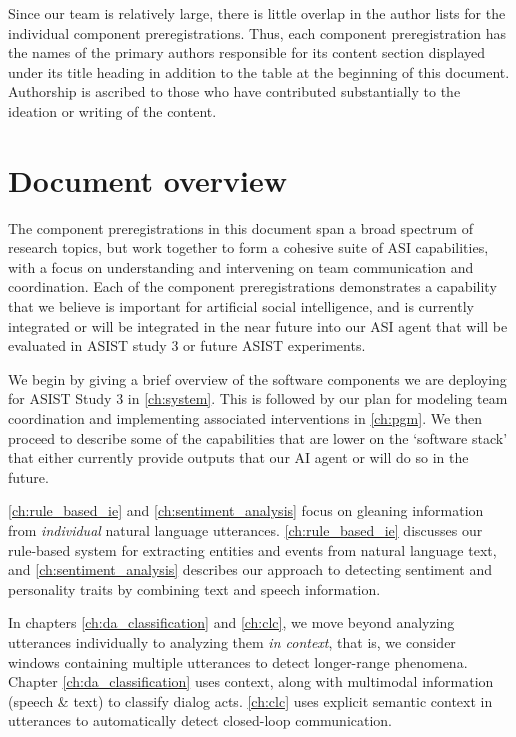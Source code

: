 Since our team is relatively large, there is little overlap in the author lists
for the individual component preregistrations. Thus, each component
preregistration has the names of the primary authors responsible for its
content section displayed under its title heading in addition to the table at
the beginning of this document. Authorship is ascribed to those who have
contributed substantially to the ideation or writing of the content.

\section{Document overview}


The component preregistrations in this document span a broad spectrum of
research topics, but work together to form a cohesive suite of ASI
capabilities, with a focus on understanding and intervening on team
communication and coordination.
Each of the component preregistrations demonstrates a capability that we
believe is important for artificial social intelligence, and is currently
integrated or will be integrated in the near future into our ASI agent that
will be evaluated in ASIST study 3 or future ASIST experiments.

We begin by giving a brief overview of the software components we are deploying
for ASIST Study 3 in \autoref{ch:system}. This is followed by our plan for
modeling team coordination and implementing associated interventions in
\autoref{ch:pgm}.  We then proceed to describe some of the capabilities that
are lower on the `software stack' that either currently provide outputs that
our AI agent or will do so in the future.

\autoref{ch:rule_based_ie} and \autoref{ch:sentiment_analysis} focus on
gleaning information from \emph{individual} natural language utterances.
\autoref{ch:rule_based_ie} discusses our rule-based system for extracting
entities and events from natural language text, and
\autoref{ch:sentiment_analysis} describes our approach to detecting sentiment
and personality traits by combining text and speech information.

In chapters \autoref{ch:da_classification} and \autoref{ch:clc}, we move beyond
analyzing utterances individually to analyzing them \emph{in context}, that is,
we consider windows containing multiple utterances to detect longer-range
phenomena. Chapter \autoref{ch:da_classification} uses context, along with
multimodal information (speech \& text) to classify dialog acts.
\autoref{ch:clc} uses explicit semantic context in utterances to automatically
detect closed-loop communication.

